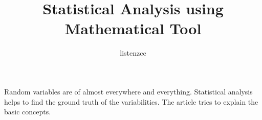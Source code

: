 \documentclass[a4paper]{article}
\title{Statistical Analysis using Mathematical Tool}
\author{listenzcc}
\begin{document}
\maketitle

\abstract
Random variables are of almost everywhere and everything.
Statistical analysis helps to find the ground truth of the variabilities.
The article tries to explain the basic concepts.

\tableofcontents



\appendix


\end{document}
